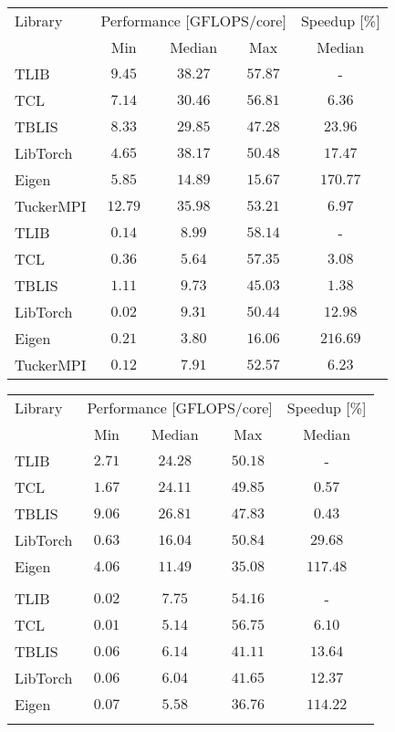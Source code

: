 \centering
\footnotesize
\begin{tabular}{lccc c}
	\toprule
	Library    & \multicolumn{3}{c}{Performance [GFLOPS/core]} & Speedup [\%] \\ 
	\cmidrule(lr){2-4} \cmidrule(lr){5-5}
	& Min   & Median  & Max & Median \\ 
	\midrule
	TLIB       & $9.45$  & $\mathbf{38.27}$   & $\mathbf{57.87}$ &  - \\
	TCL        & $7.14$  & $30.46$   & $56.81$ & $6.36$     \\
	TBLIS      & $8.33$  & $29.85$   & $47.28$ & $23.96$     \\
	LibTorch   & $4.65$  & $38.17$   & $50.48$ & $17.47$     \\
	Eigen      & $5.85$  & $14.89$   & $15.67$ & $170.77$     \\
	TuckerMPI  &$\mathbf{12.79}$  & $35.98$   & $53.21$ & $6.97$ \\
	\midrule
	TLIB       & $0.14$  & $8.99$    & $\mathbf{58.14}$ &  -     \\
	TCL        & $0.36$  & $5.64$    & $57.35$ & $3.08$ \\
	TBLIS      & $\mathbf{1.11}$  & $\mathbf{9.73}$  & $45.03$ & $1.38$     \\
	LibTorch   & $0.02$  & $9.31$    & $50.44$ & $12.98$     \\
	Eigen      & $0.21$  & $3.80$    & $16.06$ & $216.69$     \\
	TuckerMPI  & $0.12$  & $7.91$    & $52.57$ & $6.23$ \\
	\bottomrule
\end{tabular}
\hspace{5em}
\begin{tabular}{lccc c}
	\toprule
	Library    & \multicolumn{3}{c}{Performance [GFLOPS/core]} & Speedup [\%] \\ 
	\cmidrule(lr){2-4} \cmidrule(lr){5-5}
	& Min   & Median  & Max  & Median \\ 
	\midrule
	TLIB       & $2.71$  & $24.28$   & $50.18$ &   -   \\
	TCL        & $1.67$  & $24.11$   & $49.85$ & $0.57$     \\
	TBLIS      & $\mathbf{9.06}$  & $\mathbf{26.81}$  & $47.83$ & $0.43$     \\
	LibTorch   & $0.63$  & $16.04$   & $\mathbf{50.84}$ & $29.68$     \\
	Eigen      & $4.06$  & $11.49$   & $35.08$ & $117.48$     \\
	& & & & \\
	\midrule
	TLIB       & $0.02$  & $\mathbf{7.75}$  & $54.16$ &  -  \\
	TCL        & $0.01$  & $5.14$    & $\mathbf{56.75}$ & $6.10$     \\
	TBLIS      & $0.06$  & $6.14$    & $41.11$ & $13.64$     \\
	LibTorch   & $0.06$  & $6.04$ & $41.65$ & $12.37$     \\
	Eigen      & $\mathbf{0.07}$  & $5.58$  & $36.76$ & $114.22$     \\
	& & & & \\
	\bottomrule
\end{tabular}
